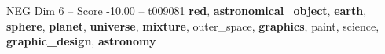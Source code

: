 \begin{textsample}{NEG Dim 6 – Score -10.00 – t009081}  \label{ex:f6_neg_014}
\textbf{red}, \textbf{astronomical\_object}, \textbf{earth}, \textbf{sphere}, \textbf{planet}, \textbf{universe}, \textbf{mixture}, outer\_space, \textbf{graphics}, paint, science, \textbf{graphic\_design}, \textbf{astronomy}

\end{textsample}
